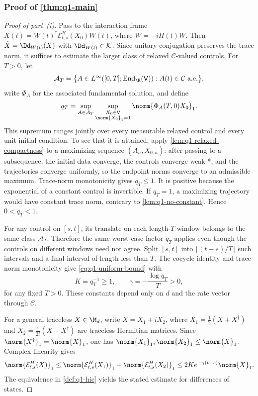 \documentclass[class=article,11pt,a4paper,crop=false]{standalone}
\begin{document}
\subsubsection*{Proof of \cref{thm:q1-main}}

\begin{proof}[Proof of part~\textup{(i)}]
	Pass to the interaction frame
	$X(t)=W(t)^\dagger\mathcal E^H_{t,s}(X_0)W(t)$, where
	$\dot W=-iH(t)W$. Then
	$\dot X=\Dd_{W(t)}(X)$ with $\Dd_{W(t)}\in\mathcal K$. Since unitary
	conjugation preserves the trace norm, it suffices to estimate the larger
	class of relaxed $\mathcal C$-valued controls. For $T>0$, let
	\begin{equation}
		\mathcal A_T=\big\{A\in L^\infty([0,T];
		\operatorname{End}_{\R}(\mathsf V)):A(t)\in\mathcal C\text{ a.e.}\big\},
	\end{equation}
	write $\Phi_A$ for the associated fundamental solution, and define
	\begin{equation}
		q_T=\sup_{A\in\mathcal A_T}
		\sup_{\substack{X_0\in\mathsf V\\\norm{X_0}_1=1}}
		\norm{\Phi_A(T,0)X_0}_1.
	\end{equation}
	This supremum ranges jointly over every measurable relaxed control and every
	unit initial condition. To see that it is attained, apply
	\cref{lem:q1-relaxed-compactness} to a maximizing sequence
	$(A_n,X_{0,n})$: after passing to a subsequence, the initial data converge,
	the controls converge weak-*, and the trajectories converge uniformly, so
	the endpoint norms converge to an admissible maximum. Trace-norm
	monotonicity gives $q_T\le1$. It is positive because the exponential of a
	constant control is invertible. If $q_T=1$, a maximizing trajectory would
	have constant trace norm, contrary to \cref{lem:q1-no-constant}. Hence
	$0<q_T<1$.

	For any control on $[s,t]$, its translate on each length-$T$ window belongs
	to the same class $\mathcal A_T$. Therefore the same worst-case factor $q_T$
	applies even though the controls on different windows need not agree. Split
	$[s,t]$ into $\lfloor(t-s)/T\rfloor$ such intervals and a final interval of
	length less than $T$. The cocycle identity and trace-norm monotonicity give
	\eqref{eq:q1-uniform-bound} with
	\begin{equation}
		K=q_T^{-1}\ge1,\qquad \gamma=-\frac{\log q_T}{T}>0,
		\label{eq:q1-constants}
	\end{equation}
	for any fixed $T>0$. These constants depend only on $d$ and the rate vector
	through $\mathcal C$.

	For a general traceless $X\in\M_d$, write $X=X_1+iX_2$, where
	$X_1=\tfrac12(X+X^\dagger)$ and
	$X_2=\tfrac1{2i}(X-X^\dagger)$ are traceless Hermitian matrices. Since
	$\norm{X^\dagger}_1=\norm{X}_1$, one has
	$\norm{X_1}_1,\norm{X_2}_1\le\norm{X}_1$. Complex linearity gives
	\begin{equation}
		\norm{\mathcal E^H_{t,s}(X)}_1
		\le\norm{\mathcal E^H_{t,s}(X_1)}_1+\norm{\mathcal E^H_{t,s}(X_2)}_1
		\le 2Ke^{-\gamma(t-s)}\norm{X}_1.
	\end{equation}
	The equivalence in \cref{def:q1-hic} yields the stated estimate for
	differences of states.
\end{proof}
\end{document}
